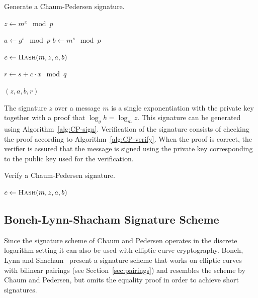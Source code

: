 \begin{algorithm}[t]
  \caption{Generate a Chaum-Pedersen signature.}
  \label{alg:CP-sign}
  \addtolength{\baselineskip}{1mm}
  \begin{algorithmic}[1]
      \State $z \gets m^x \mod p$

      \State $a \gets g^s \mod p$
      \State $b \gets m^s \mod p$

      \State $c \gets \Call{Hash}{m, z, a, b}$

      \State $r \gets s + c \cdot x \mod q$

      \Return $(z, a, b, r)$
    \EndFunction
  \end{algorithmic}
\end{algorithm}

The signature $z$ over a message $m$ is a single exponentiation with the private
key together with a proof that $\log_g h = \log_m z$. This signature can be
generated using Algorithm~\ref{alg:CP-sign}. Verification of the signature
consists of checking the proof according to Algorithm~\ref{alg:CP-verify}. When
the proof is correct, the verifier is assured that the message is signed using
the private key corresponding to the public key used for the verification.

\begin{algorithm}[t]
  \caption{Verify a Chaum-Pedersen signature.}
  \label{alg:CP-verify}
  \addtolength{\baselineskip}{1mm}
  \begin{algorithmic}[1]
      \State $c \gets \Call{Hash}{m, z, a, b}$

      \Return {}
      \EndIf

      \Return {}
      \EndIf

      \Return {}
    \EndFunction
  \end{algorithmic}
\end{algorithm}

\subsection{Boneh-Lynn-Shacham Signature Scheme}

Since the signature scheme of Chaum and Pedersen operates in the discrete
logarithm setting it can also be used with elliptic curve cryptography. Boneh,
Lynn and Shacham~\cite{BonehLS01,BonehLS04} present a signature scheme that
works on elliptic curves with bilinear pairings (see Section~\ref{sec:pairings})
and resembles the scheme by Chaum and Pedersen, but omits the equality proof in
order to achieve short signatures.

